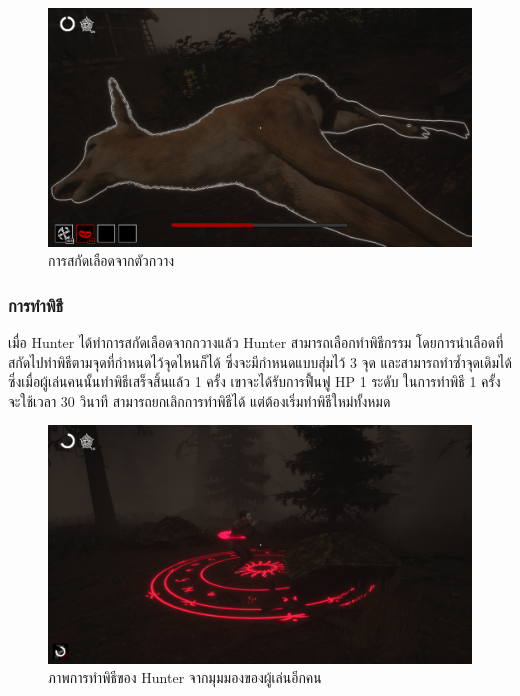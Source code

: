\begin{figure}[p]
  \begin{center}
  \includegraphics[width=\textwidth]{./img/mechanics/extract_blood.png}
  \end{center}
  \caption[การสกัดเลือดจากตัวกวาง]{การสกัดเลือดจากตัวกวาง}
  \label{การสกัดเลือดจากตัวกวาง}
\end{figure}

\subsubsection{การทำพิธี}

เมื่อ Hunter ได้ทำการสกัดเลือดจากกวางแล้ว Hunter สามารถเลือกทำพิธีกรรม โดยการนำเลือดที่สกัดไปทำพิธีตามจุดที่กำหนดไว้จุดไหนก็ได้
ซึ่งจะมีกำหนดแบบสุ่มไว้ 3 จุด และสามารถทำซ้ำจุดเดิมได้ ซึ่งเมื่อผู้เล่นคนนั้นทำพิธีเสร็จสิ้นแล้ว 1 ครั้ง เขาจะได้รับการฟื้นฟู 
HP 1 ระดับ ในการทำพิธี 1 ครั้งจะใช้เวลา 30 วินาที สามารถยกเลิกการทำพิธีได้ แต่ต้องเริ่มทำพิธีใหม่ทั้งหมด

\begin{figure}[h]
  \begin{center}
  \includegraphics[width=\textwidth]{./img/mechanics/ritual-complete.png}
  \end{center}
  \caption[ภาพการทำพิธีของ Hunter จากมุมมองของผู้เล่นอีกคน]{ภาพการทำพิธีของ Hunter จากมุมมองของผู้เล่นอีกคน}
  \label{ภาพการทำพิธีของ Hunter จากมุมมองของผู้เล่นอีกคน}
\end{figure}

